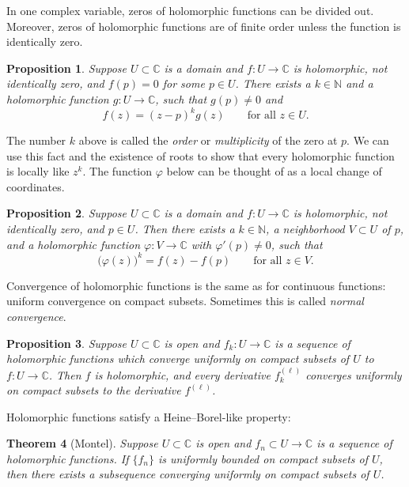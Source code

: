 \documentclass[12pt,openany]{book}
\newcommand{\C}{{\mathbb{C}}}
\newcommand{\N}{{\mathbb{N}}}
\newcommand{\myindex}[1]{#1\index{#1}}
\theoremstyle{plain}
\newtheorem{thm}{Theorem}[section]
\newtheorem{prop}[thm]{Proposition}
\theoremstyle{remark}
\theoremstyle{definition}
\theoremstyle{exercise}
\theoremstyle{example}
\begin{document}
In one complex variable, zeros of holomorphic functions
can be divided out.  Moreover, zeros
of holomorphic functions are of finite order unless
the function is identically zero.

\begin{prop}
Suppose $U \subset \C$ is a domain and
$f \colon U \to \C$ is holomorphic, not identically zero, and $f(p) = 0$
for some $p \in U$.  There exists a $k \in \N$ and
a holomorphic function $g \colon U \to \C$,
such that $g(p) \not= 0$ and
\begin{equation*}
f(z) = {(z-p)}^k g(z) \qquad \text{for all $z \in U$.}
\end{equation*}
\end{prop}

The number $k$ above is called the \emph{order}
or \emph{multiplicity}
of the zero at $p$.
We can use this fact and the existence of roots to show that every
holomorphic function is locally like $z^k$.  The function $\varphi$
below can be thought of as a local change of coordinates.

\begin{prop}
Suppose $U \subset \C$ is a domain and
$f \colon U \to \C$ is holomorphic, not identically zero, and $p \in U$.
Then there exists a $k \in \N$,
a neighborhood $V \subset U$ of $p$,  and
a holomorphic function $\varphi \colon V \to \C$ with
$\varphi'(p) \not= 0$, such that
\begin{equation*}
{\bigl(\varphi(z)\bigr)}^k = f(z) - f(p)
\qquad \text{for all $z \in V$.}
\end{equation*}
\end{prop}

Convergence of holomorphic functions is the same as for continuous
functions: uniform convergence on compact subsets.
Sometimes this is called \emph{\myindex{normal convergence}}.

\begin{prop}
Suppose $U \subset \C$ is open and $f_k \colon U \to \C$ is
a sequence of holomorphic functions which converge uniformly
on compact subsets of $U$ to $f \colon U \to \C$.  Then $f$ is holomorphic,
and every derivative $f_k^{(\ell)}$ converges uniformly on compact subsets
to the derivative $f^{(\ell)}$.
\end{prop}

Holomorphic functions satisfy a Heine--Borel-like property:

\begin{thm}[Montel]\label{thm:onevarmontel}
Suppose
$U \subset \C$ is open and
$f_n \subset U \to \C$ is a sequence of holomorphic functions.
If $\{ f_n \}$ is uniformly bounded on compact subsets of $U$,
then there exists a subsequence converging uniformly on compact subsets
of $U$.
\end{thm}
\end{document}
